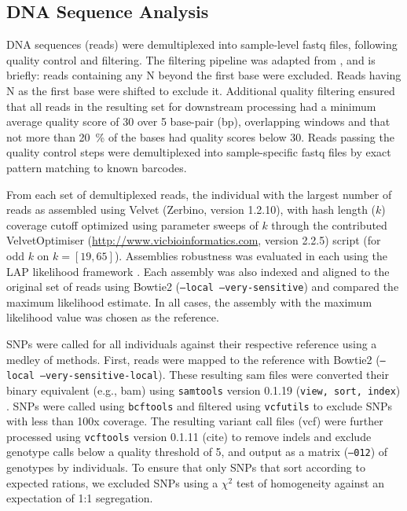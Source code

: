 \documentclass[11pt]{article}
\begin{document}
\subsection*{DNA Sequence Analysis}

DNA sequences (reads) were demultiplexed into sample-level fastq files, following quality control 
and filtering.  The filtering pipeline was adapted from \citep{Friedline:2012fm}, and is briefly: reads 
containing any N beyond the first base were excluded. Reads having N as the first base were shifted 
to exclude it.  Additional quality filtering ensured that all reads in the resulting set for downstream 
processing had a minimum average quality score of 30 over 5 base-pair (bp), overlapping windows 
and that not more than \SI{20}{\percent} of the bases had quality scores below 30. Reads passing the 
quality control steps were demultiplexed into sample-specific fastq files by exact pattern matching to 
known barcodes.

From each set of demultiplexed reads, the individual with the largest number of reads as assembled using 
Velvet (Zerbino, version 1.2.10), with hash length ($k$) coverage cutoff optimized using parameter sweeps of $k$ 
through the contributed VelvetOptimiser (\url{http://www.vicbioinformatics.com}, version 2.2.5) 
script (for odd $k$ on $k=[19,65]$).  Assemblies robustness was evaluated in each using the LAP likelihood 
framework \citep{Ghodsi:2013bc}.  Each assembly was also indexed and aligned to the original set of reads 
using Bowtie2 \citep{Langmead:2012jh} (\texttt{--local --very-sensitive}) and compared the maximum likelihood estimate. 
In all cases, the assembly with the maximum likelihood value was chosen as the reference.

SNPs were called for all individuals against their respective reference using a medley of methods.  First, 
reads were mapped to the reference with Bowtie2 (\texttt{--local --very-sensitive-local}).  These resulting 
sam files were converted their binary equivalent (e.g., bam) using \texttt{samtools} version 0.1.19 
(\texttt{view, sort, index}) \citep{Li:2009ka}.  SNPs were called using \texttt{bcftools} and filtered using 
\texttt{vcfutils} to exclude SNPs with less than 100x coverage. The resulting variant call files (vcf) 
were further processed using \texttt{vcftools} version 0.1.11 (cite) to remove indels and exclude genotype 
calls below a quality threshold of 5, and output as a matrix (\texttt{--012}) of genotypes by individuals.  
To ensure that only SNPs that sort according to expected rations, we excluded SNPs using a $\chi^2$ test of 
homogeneity against an expectation of 1:1 segregation.
\end{document}
